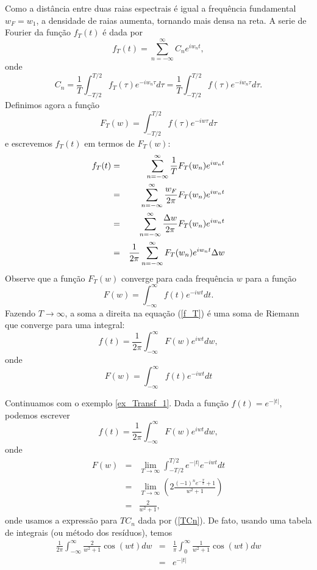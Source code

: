 Como a distância entre duas raias espectrais é igual a frequência fundamental $w_F=w_1$, a densidade de raias aumenta, tornando mais densa na reta. A serie de Fourier da função $f_T(t)$ é dada por
\begin{equation}
f_T(t)=\sum_{n=-\infty}^\infty C_n e^{i w_n t},
\end{equation}
onde 
\begin{equation}C_n=\frac{1}{T}\int_{-T/2}^{T/2}f_T(\tau)e^{-iw_n \tau}d\tau=\frac{1}{T}\int_{-T/2}^{T/2}f(\tau)e^{-iw_n \tau}d\tau.\end{equation}
Definimos agora a função \begin{equation}F_T(w)=\int_{-T/2}^{T/2}f(\tau)e^{-iw \tau}d\tau\end{equation} e escrevemos $f_T(t)$ em termos de $F_T(w)$:
\begin{eqnarray}
\nonumber f_T(t)&=&\sum_{n=-\infty}^\infty \frac{1}{T}F_T(w_n) e^{i w_n t}\\&=& \sum_{n=-\infty}^\infty \frac{w_F}{2\pi}F_T(w_n) e^{i w_n t}
\\\nonumber &=& \sum_{n=-\infty}^\infty \frac{\Delta w}{2\pi}F_T(w_n) e^{i w_n t}
\\{\label{f_T}}&=&\frac{1}{2\pi} \sum_{n=-\infty}^\infty F_T(w_n) e^{i w_n t}\Delta w
\end{eqnarray}
Observe que a função $F_T(w)$ converge para cada frequência $w$ para a função 
\begin{equation}
F(w)=\int_{-\infty}^\infty f(t) e^{-iw t}dt.
\end{equation}
Fazendo $T\to \infty$, a soma a direita na equação (\ref{f_T}) é uma soma de Riemann que converge para uma integral:
\begin{equation}
f(t)=\frac{1}{2\pi} \int_{-\infty}^\infty F(w)e^{iw t}dw,
\end{equation}
onde
\begin{equation}F(w)=\int_{-\infty}^{\infty}f(t)e^{-i w t}dt\end{equation}
\begin{ex} Continuamos com o exemplo \ref{ex_Transf_1}. Dada a função $f(t)=e^{-|t|}$, podemos escrever
\begin{equation}
f(t)=\frac{1}{2\pi} \int_{-\infty}^\infty F(w)e^{iw t}dw,
\end{equation}
onde
\begin{eqnarray*}
F(w)&=&\lim_{T\to\infty}\int_{-T/2}^{T/2}e^{-|t|} e^{-i w t}dt\\
&=&\lim_{T\to\infty}\left(2\frac{ (-1)^ne^{-\frac{T}{2}}+1}{w^2+1} \right)\\
&=&\frac{2}{w^2+1},
\end{eqnarray*}
onde usamos a expressão para $TC_n$ dada por (\ref{TCn}). De fato, usando uma tabela de integrais (ou método dos resíduos), temos
\begin{eqnarray}
\frac{1}{2\pi} \int_{-\infty}^\infty \frac{2}{w^2+1} \cos(wt)dw
&=&\frac{1}{\pi} \int_{0}^\infty \frac{1}{w^2+1} \cos(wt)dw\\
&=&e^{-|t|}
\end{eqnarray}
\end{ex}
